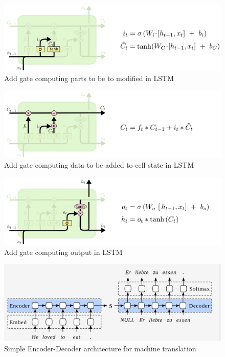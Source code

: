 \documentclass[conference]{IEEEtran}
\begin{document}
\begin{figure}
    \includegraphics[width=.99\linewidth]{img/lstm_add.png}  
    \caption{Add gate computing parts to be to modified in LSTM} 
    \label{fig:lstm_add}
\end{figure}

\begin{figure}
    \includegraphics[width=.99\linewidth]{img/lstm_add1.png}  
    \caption{Add gate computing data to be added to cell state in LSTM} 
    \label{fig:lstm_add1}
\end{figure}


\begin{figure}
    \includegraphics[width=.99\linewidth]{img/lstm_output.png}  
    \caption{Add gate computing output in LSTM} 
    \label{fig:lstm_output}
\end{figure}

\begin{figure}
    \includegraphics[width=.99\linewidth]{img/enc_dec.png}  
    \caption{Simple Encoder-Decoder architecture for machine translation} 
    \label{fig:enc_dec}
\end{figure}
\end{document}
